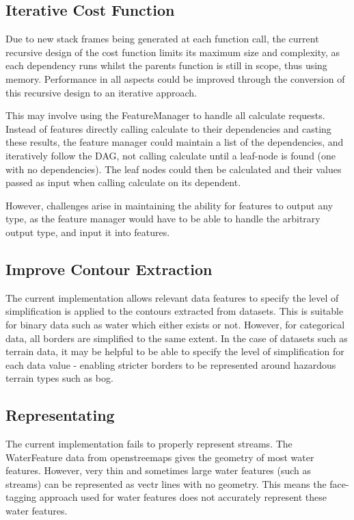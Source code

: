 \documentclass[12pt]{article}
\begin{document}
\subsection{Iterative Cost Function}

Due to new stack frames being generated at each function call, the current recursive design of the cost function limits its maximum size and complexity, as each dependency runs whilst the parents function is still in scope, thus using memory. Performance in all aspects could be improved through the conversion of this recursive design to an iterative approach.

This may involve using the FeatureManager to handle all calculate requests. Instead of features directly calling calculate to their dependencies and casting these results, the feature manager could maintain a list of the dependencies, and iteratively follow the DAG, not calling calculate until a leaf-node is found (one with no dependencies). The leaf nodes could then be calculated and their values passed as input when calling calculate on its dependent.

However, challenges arise in maintaining the ability for features to output any type, as the feature manager would have to be able to handle the arbitrary output type, and input it into features.

\subsection{Improve Contour Extraction}

The current implementation allows relevant data features to specify the level of simplification is applied to the contours extracted from datasets. This is suitable for binary data such as water which either exists or not. However, for categorical data, all borders are simplified to the same extent. In the case of datasets such as terrain data, it may be helpful to be able to specify the level of simplification for each data value - enabling stricter borders to be represented around hazardous terrain types such as bog.

\subsection{Representating}

The current implementation fails to properly represent streams. The WaterFeature data from openstreemaps gives the geometry of most water features. However, very thin and sometimes large water features (such as streams) can be represented as vectr lines with no geometry. This means the face-tagging approach used for water features does not accurately represent these water features.
\end{document}
